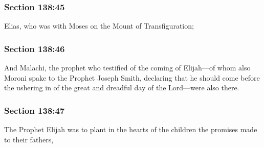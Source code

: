 	\subsubsection{Section 138:45} %
		\label{DC138-45}

		Elias, who was with Moses on the Mount of Transfiguration;


	\subsubsection{Section 138:46} %
		\label{DC138-46}

		And Malachi, the prophet who testified of the coming of Elijah—of whom also Moroni spake to the Prophet Joseph Smith, declaring that he should come before the ushering in of the great and dreadful day of the Lord—were also there.


	\subsubsection{Section 138:47} %
		\label{DC138-47}

		The Prophet Elijah was to plant in the hearts of the children the promises made to their fathers,


